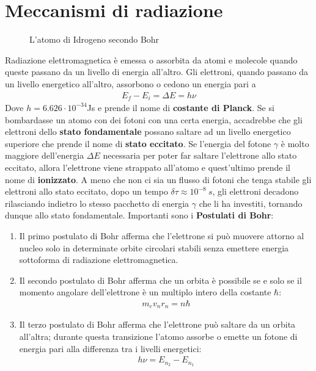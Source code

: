 \documentclass[a4paper, oneside]{book}
\begin{document}
\section{Meccanismi di radiazione}
\begin{figure}
    \centering
    \caption{L'atomo di Idrogeno secondo Bohr}
\end{figure}
Radiazione elettromagnetica è emessa o assorbita da atomi e molecole quando queste passano
da un livello di energia all'altro. Gli elettroni, quando passano da un livello energetico 
all'altro, assorbono o cedono un energia pari a
\begin{align}
    E_f - E_i = \Delta E = h\nu 
\end{align}
Dove $h = 6.626 \cdot 10^{-34}$Js e prende il nome di \textbf{costante di Planck}.
Se si bombardasse un atomo con dei fotoni con una certa energia, accadrebbe che 
gli elettroni dello \textbf{stato fondamentale} possano saltare ad un livello energetico superiore 
che prende il nome di \textbf{stato eccitato}. Se
l'energia del fotone $\gamma$ è molto maggiore dell'energia $\Delta E$ necessaria per
poter far saltare l'elettrone allo stato eccitato, allora l'elettrone viene strappato 
all'atomo e quest'ultimo prende il nome di \textbf{ionizzato}.
A meno che non ci sia un flusso di fotoni che tenga stabile gli elettroni
allo stato eccitato, dopo un tempo $\delta \tau \approx 10^{-8} \ s$, gli elettroni decadono
rilasciando indietro lo stesso pacchetto di energia $\gamma$ che li ha
investiti, tornando dunque allo stato fondamentale. Importanti sono 
i \textbf{Postulati di Bohr}:
\begin{enumerate}
    \item Il primo postulato di Bohr afferma che l'elettrone si può muovere 
attorno al nucleo solo in determinate orbite circolari stabili senza 
emettere energia sottoforma di radiazione elettromagnetica. 
\item Il secondo postulato di Bohr afferma che un orbita è possibile se e solo se
il momento angolare dell'elettrone è un multiplo intero della costante $\hbar$:
\begin{align}
    m_e v_n r_n = n\hbar
\end{align}
\item Il terzo postulato di Bohr afferma che l'elettrone può saltare da un orbita 
all'altra; durante questa transizione l'atomo assorbe o emette un fotone di energia 
pari alla differenza tra i livelli energetici:
\begin{gather*}
    h\nu = E_{n_2} - E_{n_1}
\end{gather*} 
\end{enumerate}
\end{document}
